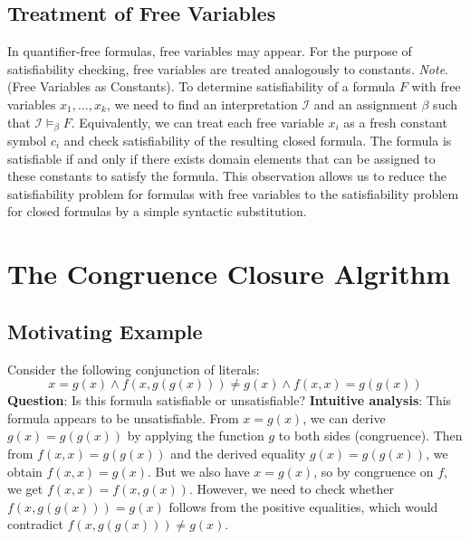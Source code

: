 \documentclass[a4paper]{article}
\theoremstyle{definition}
\begin{document}
\subsection{Treatment of Free Variables}
In quantifier-free formulas, free variables may appear. For the purpose of satisfiability checking,
free variables are treated analogously to constants.
\vspace{1em}
\noindent
\newline
\textit{Note}. (Free Variables as Constants). To determine satisfiability of a formula \( F \) with free variables
\( x_1, \ldots, x_k \), we need to find an interpretation \( \mathcal{I} \) and an assignment \( \beta \) such that \( \mathcal{I} \models_{\beta} F \).
\vspace{1em}
\noindent
\newline
Equivalently, we can treat each free variable \( x_i \) as a fresh constant symbol \( c_i \) and check satisfiability of the resulting 
closed formula. The formula is satisfiable if and only if there exists domain elements that can be assigned to these constants to satisfy the formula.
\vspace{1em}
\noindent
\newline
This observation allows us to reduce the satisfiability problem for formulas with free variables 
to the satisfiability problem for closed formulas by a simple syntactic substitution.
\section{The Congruence Closure Algrithm}
\subsection{Motivating Example}
Consider the following conjunction of literals:
\[
  x = g(x) \wedge f(x,g(g(x))) \neq g(x) \wedge f(x,x) = g(g(x))
\]
\textbf{Question}: Is this formula satisfiable or unsatisfiable?
\vspace{1em}
\noindent
\newline
\textbf{Intuitive analysis}: This formula appears to be unsatisfiable. From \( x = g(x) \), we can derive \( g(x) = g(g(x)) \) by applying 
the function \( g \) to both sides (congruence). Then from \( f(x,x) = g(g(x)) \) and the derived equality \( g(x) = g(g(x)) \), we obtain \( f(x,x) = g(x) \). 
But we also have \( x = g(x) \), so by congruence on \( f \), we get \( f(x,x) = f(x,g(x)) \). However, we need to check whether 
\( f(x,g(g(x))) = g(x) \) follows from the positive equalities, which would contradict \( f(x,g(g(x))) \neq g(x) \).
\end{document}
